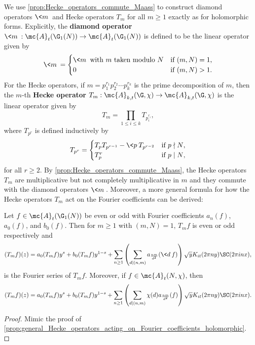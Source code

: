     We use \cref{prop:Hecke_operators_commute_Maass} to construct diamond operators $\<m\>$ and Hecke operators $T_{m}$ for all $m \ge 1$ exactly as for holomorphic forms. Explicitly, the \textbf{diamond operator} $\<m\>:\mc{A}_{t}(\G_{1}(N)) \to \mc{A}_{t}(\G_{1}(N))$ is defined to be the linear operator given by
    \[
      \<m\> = \begin{cases} \<m\> \text{ with $m$ taken modulo $N$} & \text{if $(m,N) = 1$,} \\ 0 & \text{if $(m,N) > 1$.} \end{cases}
    \]
    For the Hecke operators, if $m = p_{1}^{r_{1}}p_{2}^{r_{2}} \cdots p_{k}^{r_{k}}$ is the prime decomposition of $m$, then the $m$-th \textbf{Hecke operator} $T_{m}:\mc{A}_{k,t}(\G,\chi) \to \mc{A}_{k,t}(\G,\chi)$ is the linear operator given by
    \[
      T_{m} = \prod_{1 \le i \le k}T_{p_{i}^{r_{i}}},
    \]
    where $T_{p^{r}}$ is defined inductively by
    \[
      T_{p^{r}} = \begin{cases} T_{p}T_{p^{r-1}}-\<p\>T_{p^{r-2}} & \text{if $p \nmid N$}, \\ T_{p}^{r} & \text{if $p \mid N$}, \end{cases}
    \]
    for all $r \ge 2$. By \cref{prop:Hecke_operators_commute_Maass}, the Hecke operators $T_{m}$ are multiplicative but not completely multiplicative in $m$ and they commute with the diamond operators $\<m\>$. Moreover, a more general formula for how the Hecke operators $T_{m}$ act on the Fourier coefficients can be derived:

    \begin{proposition}\label{prop:general_Hecke_operators_acting_on_Fourier_coefficients_Maass}
      Let $f \in \mc{A}_{t}(\G_{1}(N))$ be even or odd with Fourier coefficients $a_{n}(f)$, $a_{0}(f)$, and $b_{0}(f)$. Then for $m \ge 1$ with $(m,N) = 1$, $T_{m}f$ is even or odd respectively and
      \[
        (T_{m}f)(z) = a_{0}(T_{m}f)y^{s}+b_{0}(T_{m}f)y^{1-s}+\sum_{n \ge 1}\left(\sum_{d \mid (n,m)}a_{\frac{nm}{d^{2}}}(\<d\>f)\right)\sqrt{y}K_{it}(2\pi ny)\SC(2\pi inx),
      \]
      is the Fourier series of $T_{m}f$. Moreover, if $f \in \mc{A}_{t}(N,\chi)$, then
      \[
        (T_{m}f)(z) = a_{0}(T_{m}f)y^{s}+b_{0}(T_{m}f)y^{1-s}+\sum_{n \ge 1}\left(\sum_{d \mid (n,m)}\chi(d)a_{\frac{nm}{d^{2}}}(f)\right)\sqrt{y}K_{it}(2\pi ny)\SC(2\pi inx).
      \]
    \end{proposition}
    \begin{proof}
      Mimic the proof of \cref{prop:general_Hecke_operators_acting_on_Fourier_coefficients_holomorphic}.
    \end{proof}

